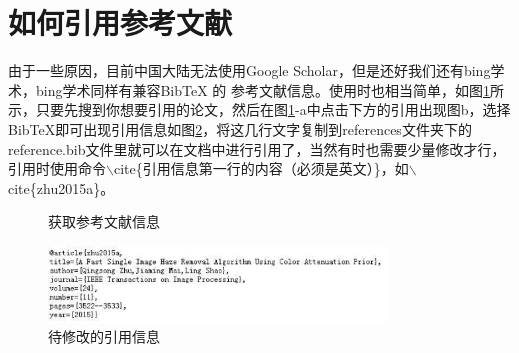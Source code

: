 \section{如何引用参考文献}
由于一些原因，目前中国大陆无法使用Google Scholar，但是还好我们还有bing学术，bing学术同样有兼容BibTeX 的
参考文献信息。使用时也相当简单，如图\ref{fig:subfig2}所示，只要先搜到你想要引用的论文，然后在图\ref{fig:subfig2}-a中点击下方的引用出现图b，选择BibTeX即可出现引用信息如图\ref{fig:fig3}，将这几行文字复制到references文件夹下的reference.bib文件里就可以在文档中进行引用了，当然有时也需要少量修改才行，引用时使用命令$\backslash$cite\{引用信息第一行的内容（必须是英文）\}，如$\backslash$cite\{zhu2015a\}\cite{zhu2015a}。
\begin{figure}[htbp]
  \centering
  \caption{获取参考文献信息}\label{fig:subfig2}
\end{figure}

\begin{figure}[htbp]
  	\centering
  	\includegraphics[width=0.8\textwidth]{figures/refresult}
  	\caption{待修改的引用信息}\label{fig:fig3}
\end{figure}

